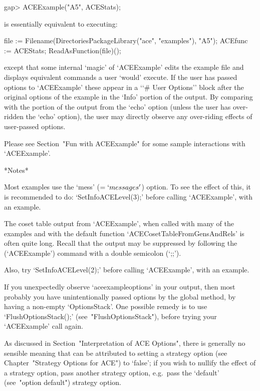 \beginexample
gap> ACEExample("A5", ACEStats);
\endexample

is essentially equivalent to executing:

\beginexample
file := Filename(DirectoriesPackageLibrary("ace", "examples"), "A5");
ACEfunc := ACEStats;
ReadAsFunction(file)();
\endexample

except that  some  internal  \lq{}magic'  of  `ACEExample'  edits  the
example file and  displays  equivalent  commands  a  user  \lq{}would'
execute. If the user has passed options to `ACEExample'  these  appear
in a \lq{}`\# User Options'' block after the original options  of  the
example in the `Info' portion of the output.  By  comparing  with  the
portion of the output from the `echo'  option  (unless  the  user  has
over-ridden the `echo' option), the  user  may  directly  observe  any
over-riding effects of user-passed options.

Please see Section~"Fun with ACEExample" for some sample  interactions
with `ACEExample'.

*Notes*

Most examples use the `mess'  ($=  `messages'$)  option.  To  see  the
effect of this, it is recommended to do: `SetInfoACELevel(3);'  before
calling `ACEExample', with an example.

The coset table output from `ACEExample', when called with many of the
examples     and     with     the     default     {\ACE}      function
`ACECosetTableFromGensAndRels' is often quite long.  Recall  that  the
output may be suppressed by following the (`ACEExample') command  with
a double semicolon (`;;').

Also, try `SetInfoACELevel(2);' before  calling `ACEExample', with  an
example.

If you unexpectedly observe `aceexampleoptions' in your  output,  then
most probably you have unintentionally passed options  by  the  global
method, by having a non-empty `OptionsStack'. One possible  remedy  is
to use `FlushOptionsStack();' (see~"FlushOptionsStack"), before trying
your `ACEExample' call again.

As discussed in Section~"Interpretation  of  ACE  Options",  there  is
generally no sensible meaning that can  be  attributed  to  setting  a
strategy option (see Chapter~"Strategy Options for ACE")  to  `false';
if you wish to nullify the effect of a strategy option,  pass  another
strategy  option,  e.g.~pass  the  `default'  (see~"option   default")
strategy option.

\enditems

